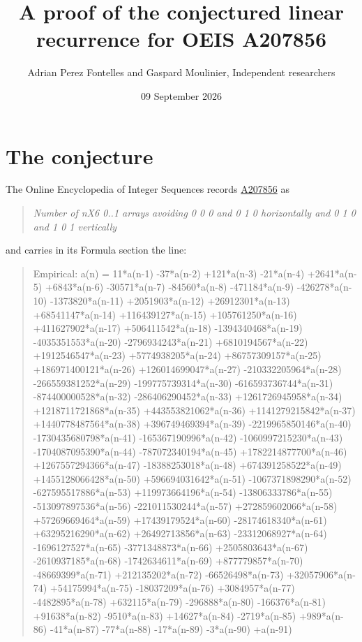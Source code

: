 \documentclass[11pt]{article}
\title{A proof of the conjectured linear recurrence for OEIS A207856}
\author{Adrian Perez Fontelles and Gaspard Moulinier, Independent researchers}
\date{09 September 2026}
\theoremstyle{definition}
\begin{document}
\maketitle
\section{The conjecture}

The Online Encyclopedia of Integer Sequences records \href{https://oeis.org/A207856}{A207856} as

\begin{quote}\itshape Number of nX6 0..1 arrays avoiding 0 0 0 and 0 1 0 horizontally and 0 1 0 and 1 0 1 vertically\end{quote}

and carries in its Formula section the line:

\begin{quote}\ttfamily Empirical: a(n) = 11*a(n-1) -37*a(n-2) +121*a(n-3) -21*a(n-4) +2641*a(n-5) +6843*a(n-6) -30571*a(n-7) -84560*a(n-8) -471184*a(n-9) -426278*a(n-10) -1373820*a(n-11) +2051903*a(n-12) +26912301*a(n-13) +68541147*a(n-14) +116439127*a(n-15) +105761250*a(n-16) +411627902*a(n-17) +506411542*a(n-18) -1394340468*a(n-19) -4035351553*a(n-20) -2796934243*a(n-21) +6810194567*a(n-22) +1912546547*a(n-23) +5774938205*a(n-24) +86757309157*a(n-25) +186971400121*a(n-26) +126014699047*a(n-27) -210332205964*a(n-28) -266559381252*a(n-29) -199775739314*a(n-30) -616593736744*a(n-31) -874400000528*a(n-32) -286406290452*a(n-33) +1261726945958*a(n-34) +1218711721868*a(n-35) +443553821062*a(n-36) +1141279215842*a(n-37) +1440778487564*a(n-38) +396749469394*a(n-39) -2219965850146*a(n-40) -1730435680798*a(n-41) -165367190996*a(n-42) -1060997215230*a(n-43) -1704087095390*a(n-44) -787072340194*a(n-45) +1782214877700*a(n-46) +1267557294366*a(n-47) -18388253018*a(n-48) +674391258522*a(n-49) +1455128066428*a(n-50) +596694031642*a(n-51) -1067371898290*a(n-52) -627595517886*a(n-53) +119973664196*a(n-54) -13806333786*a(n-55) -513097897536*a(n-56) -221011530244*a(n-57) +272859602066*a(n-58) +57269669464*a(n-59) +17439179524*a(n-60) -28174618340*a(n-61) +63295216290*a(n-62) +26492713856*a(n-63) -23312068927*a(n-64) -1696127527*a(n-65) -3771348873*a(n-66) +2505803643*a(n-67) -2610937185*a(n-68) -1742634611*a(n-69) +877779857*a(n-70) -48669399*a(n-71) +212135202*a(n-72) -66526498*a(n-73) +32057906*a(n-74) +54175994*a(n-75) -18037209*a(n-76) +3084957*a(n-77) -4482895*a(n-78) +632115*a(n-79) -296888*a(n-80) -166376*a(n-81) +91638*a(n-82) -9510*a(n-83) +14627*a(n-84) -2719*a(n-85) +989*a(n-86) -41*a(n-87) -77*a(n-88) -17*a(n-89) -3*a(n-90) +a(n-91)\end{quote}
\end{document}
